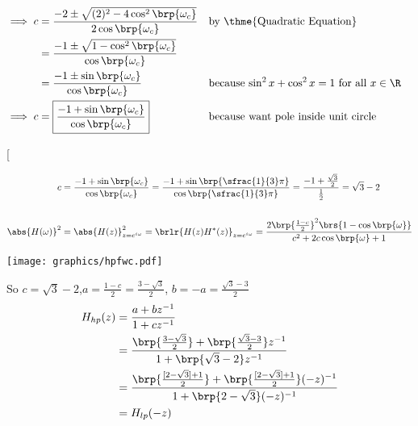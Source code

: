 {\begin{align*}
  \\\implies c &= \frac{-2 \pm \sqrt{(2)^2 -4\cos^2\brp{\omega_c}}}
                       {2\cos\brp{\omega_c}}
               && \text{by \thme{Quadratic Equation}}
             \\&= \frac{-1 \pm \sqrt{1 -\cos^2\brp{\omega_c}}}
                       {\cos\brp{\omega_c}}
             \\&= \frac{-1 \pm \sin\brp{\omega_c}}
                       {\cos\brp{\omega_c}}
               && \text{because $\sin^2x + \cos^2x = 1$ for all $x\in\R$}
  \\\implies c &=
      \boxed{\frac{-1 + \sin\brp{\omega_c}}
                    {\cos\brp{\omega_c}}}
               && \text{because want pole inside unit circle}
\end{align*}}




\begin{example}[

{\begin{align*}
  c &= \frac{-1 + \sin\brp{\omega_c}}{\cos\brp{\omega_c}}
     = \frac{-1 + \sin\brp{\sfrac{1}{3}\pi}}{\cos\brp{\sfrac{1}{3}\pi}}
     = \frac{-1 + \frac{\sqrt{3}}{2}}{\frac{1}{2}}
     = \sqrt{3} - 2
  \\
  \\
  \abs{H(\omega)}^2
    &= \abs{H(z)}^2_{z=e^{i\omega}}
     = \brlr{H(z)H^\ast(z)}_{z=e^{i\omega}}
     = \frac{2\brp{\frac{1-c}{2}}^2\brs{1 -  \cos\brp{\omega}}}
            {c^2 + 2 c\cos\brp{\omega} + 1}
\end{align*}}

\texttt{[image: graphics/hpfwc.pdf]}
\end{example}


So $c=\sqrt{3}-2$,\qquad $a=\frac{1-c}{2}=\frac{3-\sqrt{3}}{2}$, \qquad $b=-a=\frac{\sqrt{3}-3}{2}$
\begin{align*}
  H_{hp}(z)
    &= \frac{a + bz^{-1}}{1+cz^{-1}}
  \\&= \frac{\brp{\frac{3-\sqrt{3}}{2}} + \brp{\frac{\sqrt{3}-3}{2}}z^{-1}}
            {1+\brp{\sqrt{3}-2}z^{-1}}
  \\&= \frac{\brp{\frac{[2-\sqrt{3}]+1}{2}} + \brp{\frac{[2-\sqrt{3}]+1}{2}}(-z)^{-1}}
            {1+\brp{2-\sqrt{3}}(-z)^{-1}}
  \\&= H_{lp}(-z)
\end{align*}






